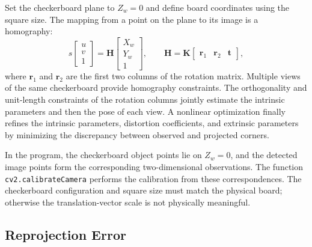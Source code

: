 Set the checkerboard plane to \(Z_w=0\) and define board coordinates using the square size. The mapping from a point on the plane to its image is a homography:
\begin{equation}
s
\begin{bmatrix}
u\\v\\1
\end{bmatrix}
=
\mathbf{H}
\begin{bmatrix}
X_w\\Y_w\\1
\end{bmatrix},
\qquad
\mathbf{H}=\mathbf{K}
\begin{bmatrix}
\mathbf{r}_1&\mathbf{r}_2&\mathbf{t}
\end{bmatrix},
\label{eq:task2-homography}
\end{equation}
where \(\mathbf r_1\) and \(\mathbf r_2\) are the first two columns of the rotation matrix. Multiple views of the same checkerboard provide homography constraints. The orthogonality and unit-length constraints of the rotation columns jointly estimate the intrinsic parameters and then the pose of each view. A nonlinear optimization finally refines the intrinsic parameters, distortion coefficients, and extrinsic parameters by minimizing the discrepancy between observed and projected corners.

In the program, the checkerboard object points lie on \(Z_w=0\), and the detected image points form the corresponding two-dimensional observations. The function \texttt{cv2.calibrateCamera} performs the calibration from these correspondences. The checkerboard configuration and square size must match the physical board; otherwise the translation-vector scale is not physically meaningful.

\subsection{Reprojection Error}\label{sec:task2-reprojection}

